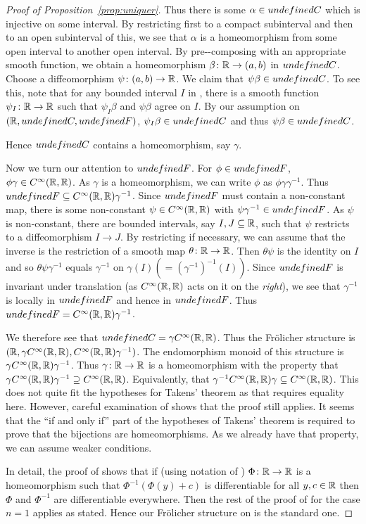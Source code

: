 \documentclass[%
a4paper,%
arxiv,%
defaults
]{myclass}
\begin{document}
\begin{proof}[{Proof of Proposition~\ref{prop:uniquer}}]
Thus there is some \(\alpha \in \m{C}\) which is injective on some interval.
By restricting first to a compact subinterval and then to an open subinterval of this, we see that \(\alpha\) is a homeomorphism from some open interval to another open interval.
By pre\hyp{}\hyp{}composing with an appropriate smooth function, we obtain a homeomorphism \(\beta \colon \mathbb{R} \to (a,b)\) in \(\m{C}\).
Choose a diffeomorphism \(\psi \colon (a,b) \to \mathbb{R}\).
We claim that \(\psi \beta \in \m{C}\).
To see this, note that for any bounded interval \(I\) in \R, there is a smooth function \(\psi_I \colon \mathbb{R} \to \mathbb{R}\) such that \(\psi_I \beta\) and \(\psi \beta\) agree on \(I\).
By our assumption on \((\R, \m{C}, \m{F})\), \(\psi_I \beta \in \m{C}\) and thus \(\psi \beta \in \m{C}\).

Hence \(\m{C}\) contains a homeomorphism, say \(\gamma\).

Now we turn our attention to \(\m{F}\).
For \(\phi \in \m{F}\), \(\phi \gamma \in C^\infty(\mathbb{R},\mathbb{R})\).
As \(\gamma\) is a homeomorphism, we can write \(\phi\) as \(\phi \gamma \gamma^{-1}\).
Thus \(\m{F} \subseteq \Ci(\R,\R) \gamma^{-1}\).
Since \(\m{F}\) must contain a non\hyp{}constant map, there is some non\hyp{}constant \(\psi \in C^\infty(\mathbb{R},\mathbb{R})\) with \(\psi \gamma^{-1} \in \m{F}\).
As \(\psi\) is non\hyp{}constant, there are bounded intervals, say \(I, J \subseteq \mathbb{R}\), such that \(\psi\) restricts to a diffeomorphism \(I \to J\).
By restricting if necessary, we can assume that the inverse is the restriction of a smooth map \(\theta \colon \mathbb{R} \to \mathbb{R}\).
Then \(\theta \psi\) is the identity on \(I\) and so \(\theta \psi \gamma^{-1}\) equals \(\gamma^{-1}\) on \(\gamma(I) (= (\gamma^{-1})^{-1}(I))\).
Since \(\m{F}\) is invariant under translation (as \(C^\infty(\mathbb{R},\mathbb{R})\) acts on it on the \emph{right}), we see that \(\gamma^{-1}\) is locally in \(\m{F}\) and hence in \(\m{F}\).
Thus \(\m{F} = \Ci(\R,\R) \gamma^{-1}\).

We therefore see that \(\m{C} = \gamma \Ci(\R,\R)\).
Thus the Fr\"olicher structure is \((\mathbb{R}, \gamma C^\infty(\mathbb{R},\mathbb{R}), C^\infty(\mathbb{R},\mathbb{R}) \gamma^{-1})\).
The endomorphism monoid of this structure is \(\gamma C^\infty(\mathbb{R},\mathbb{R}) \gamma^{-1}\).
Thus \(\gamma \colon \mathbb{R} \to \mathbb{R}\) is a homeomorphism with the property that \(\gamma C^\infty(\mathbb{R},\mathbb{R}) \gamma^{-1} \supseteq C^\infty(\mathbb{R},\mathbb{R})\).
Equivalently, that \(\gamma^{-1} C^\infty(\mathbb{R},\mathbb{R}) \gamma \subseteq C^\infty(\mathbb{R},\mathbb{R})\).
This does not quite fit the hypotheses for Takens' theorem as that requires equality here.
However, careful examination of \cite{ft} shows that the proof still applies.
It seems that the ``if and only if'' part of the hypotheses of Takens' theorem is required to prove that the bijections are homeomorphisms.
As we already have that property, we can assume weaker conditions.

In detail, the proof of \cite[Lemma~3.1]{ft} shows that if (using notation of \cite{ft}) \(\Phi \colon \mathbb{R} \to \mathbb{R}\) is a homeomorphism such that \(\Phi^{-1}(\Phi(y) + c)\) is differentiable for all \(y, c \in \mathbb{R}\) then \(\Phi\) and \(\Phi^{-1}\) are differentiable everywhere.
Then the rest of the proof of \cite[Theorem~2]{ft} for the case \(n = 1\) applies as stated.
Hence our Fr\"olicher structure on \R is the standard one.
\end{proof}
\end{document}
